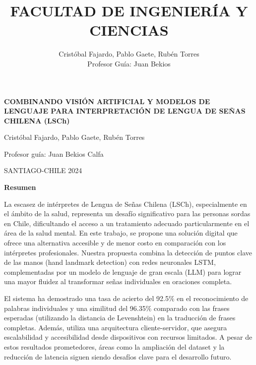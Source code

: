 \documentclass[10pt]{article}
\title{FACULTAD DE INGENIERÍA Y CIENCIAS}
\author{Cristóbal Fajardo, Pablo Gaete, Rubén Torres \\ 
Profesor Guía: Juan Bekios}
\begin{document}
\maketitle

\vspace{5\baselineskip}
\begin{center}
{\Large \textbf{COMBINANDO VISIÓN ARTIFICIAL Y MODELOS DE LENGUAJE PARA INTERPRETACIÓN DE LENGUA DE SEÑAS CHILENA (LSCh)}\par}
\end{center}

\vspace{5\baselineskip}



\vspace{1\baselineskip}
\begin{center}
{\large Cristóbal Fajardo, Pablo Gaete, Rubén Torres}
\end{center}


\begin{center}
{\large Profesor guía: Juan Bekios Calfa}
\end{center}


\vspace{5\baselineskip}
\begin{center}
{\small SANTIAGO-CHILE 2024}
\end{center}


\vspace{3\baselineskip}
\newpage
\begin{center}
{\Large\textbf{Resumen}}
\end{center}

\vspace{1\baselineskip}
La escasez de intérpretes de Lengua de Señas Chilena (LSCh), especialmente en el ámbito de la salud, representa un desafío significativo para las personas sordas en Chile, dificultando el acceso a un tratamiento adecuado particularmente en el área de la salud mental. En este trabajo, se propone una solución digital que ofrece una alternativa accesible y de menor costo en comparación con los intérpretes profesionales. Nuestra propuesta combina la detección de puntos clave de las manos (hand landmark detection) con redes neuronales LSTM, complementadas por un modelo de lenguaje de gran escala (LLM) para lograr una mayor fluidez al transformar señas individuales en oraciones completa.

El sistema ha demostrado una tasa de acierto del 92.5$\%$ en el reconocimiento de palabras individuales y una similitud del 96.35$\%$ comparado con las frases esperadas (utilizando la distancia de Levenshtein) en la traducción de frases completas. Además, utiliza una arquitectura cliente-servidor, que asegura escalabilidad y accesibilidad desde dispositivos con recursos limitados. A pesar de estos resultados prometedores, áreas como la ampliación del dataset y la reducción de latencia siguen siendo desafíos clave para el desarrollo futuro.
\end{document}
